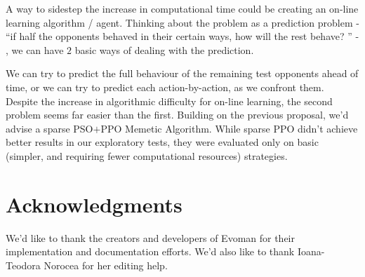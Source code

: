 \documentclass[conference]{IEEEtran}
\begin{document}
    A way to sidestep the increase in computational time could be creating an on-line learning algorithm / agent. Thinking about the problem as a prediction problem - ``if half the opponents behaved in their certain ways, how will the rest behave? '' - , we can have $2$ basic ways of dealing with the prediction. 

    
    

    
    We can try to predict the full behaviour of the remaining test opponents ahead of time, or we can try to predict each action-by-action, as we confront them. Despite the increase in algorithmic difficulty for on-line learning, the second problem seems far easier than the first. Building on the previous proposal, we'd advise a sparse PSO$+$PPO Memetic Algorithm. While sparse PPO didn't achieve better results in our exploratory tests, they were evaluated only on basic (simpler, and requiring fewer computational resources) strategies. 

     

    \section{Acknowledgments}
    We'd like to thank the creators and developers of Evoman for their implementation and documentation efforts. We'd also like to thank Ioana-Teodora Norocea for her editing help.
\end{document}
